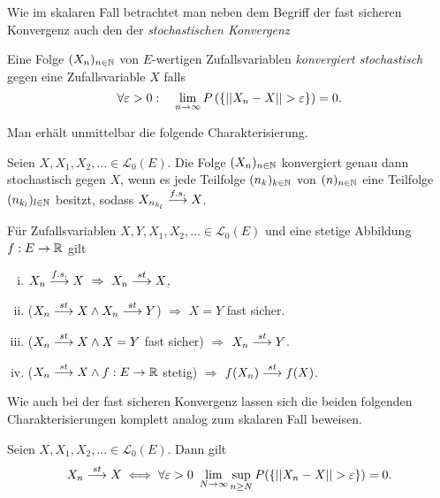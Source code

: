 Wie im skalaren Fall betrachtet man neben dem Begriff der fast sicheren Konvergenz auch den der \textit{stochastischen Konvergenz}

\begin{mydef}
    Eine Folge $(X_n)_{n \in \mathbb{N}}$ von $E$-wertigen Zufallsvariablen \textit{konvergiert stochastisch} gegen eine Zufallsvariable $X$ falls
    $$
        \forall \varepsilon > 0: \quad \lim_{n \to \infty}P\left(\left\{ \lvert\lvert X_n - X  \rvert\rvert > \varepsilon \right\}\right) = 0. 
    $$      
\end{mydef}

Man erhält unmittelbar die folgende Charakterisierung. 

\begin{theorem}[Teilfolgenkriterium]
    Seien $X,X_1,X_2,... \in \mathcal{L}_0(E)$. Die Folge $(X_n)_{n \in \mathbb{N}}$ konvergiert genau dann stochastisch gegen $X$, 
    wenn es jede Teilfolge $(n_k)_{k \in \mathbb{N}}$ von $(n)_{n \in \mathbb{N}}$ eine Teilfolge $(n_{k_l})_{l \in \mathbb{N}}$ besitzt, sodass $X_{n_{k_l}} \overset{f.s.}{\longrightarrow} X$.  
\end{theorem}

\begin{corollary}
    Für Zufallsvariablen $X,Y, X_1, X_2,... \in \mathcal{L}_0(E)$ und eine stetige Abbildung $f:E \to \mathbb{R}$ gilt
    \begin{enumerate}[(i)]
        \item $X_n \overset{f.s.}{\longrightarrow} X \ \Rightarrow \ X_n \overset{st}{\longrightarrow} X$,
        \item ($X_n \overset{st}{\longrightarrow} X \land X_n \overset{st}{\longrightarrow} Y$) $\Rightarrow$ $ X = Y$ fast sicher. 
        \item ($X_n \overset{st}{\longrightarrow} X \land X = Y$ fast sicher) $\Rightarrow$ $X_n \overset{st}{\longrightarrow} Y$. 
        \item ($X_n \overset{st}{\longrightarrow} X \land f:E \to \mathbb{R}$ stetig) $\Rightarrow$ $f(X_n) \overset{st}{\longrightarrow} f(X)$. 
    \end{enumerate}
\end{corollary}

Wie auch bei der fast sicheren Konvergenz lassen sich die beiden folgenden Charakterisierungen komplett analog zum skalaren Fall beweisen. 

\begin{theorem}
    Seien $X, X_1,X_2,... \in \mathcal{L}_0(E)$. Dann gilt
    \begin{align*}
        X_n \overset{st}{\longrightarrow} X \iff \forall \varepsilon > 0 \ \lim_{N \to \infty}\sup_{n \geq N}P(\{\lvert\lvert X_n - X \rvert\rvert > \varepsilon \}) = 0.
    \end{align*}
\end{theorem}

